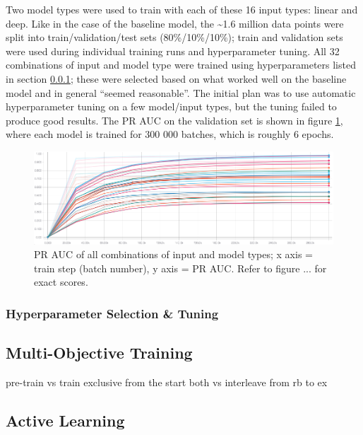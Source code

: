 Two model types were used to train with each of these 16 input types: linear and deep.
Like in the case of the baseline model, the \textasciitilde1.6 million data points were split into train/validation/test sets (80\%/10\%/10\%); train and validation sets were used during individual training runs and hyperparameter tuning.
All 32 combinations of input and model type were trained using hyperparameters listed in section \ref{tuning}; these were selected based on what worked well on the baseline model and in general ``seemed reasonable''.
The initial plan was to use automatic hyperparameter tuning on a few model/input types, but the tuning failed to produce good results.
The PR AUC on the validation set is shown in figure \ref{pr_auc_all}, where each model is trained for 300 000 batches, which is roughly 6 epochs.

\begin{figure}
  \includegraphics[width=\linewidth]{figures/pr_auc_all}
  \caption{PR AUC of all combinations of input and model types; x axis = train step (batch number), y axis = PR AUC. Refer to figure ... for exact scores.}
  \label{pr_auc_all}
\end{figure}


\subsubsection{Hyperparameter Selection \& Tuning}
\label{tuning}

\subsection{Multi-Objective Training}
\label{multiobj}

pre-train vs train exclusive from the start
both vs interleave
from rb to ex

\subsection{Active Learning}
\label{exp_al}

